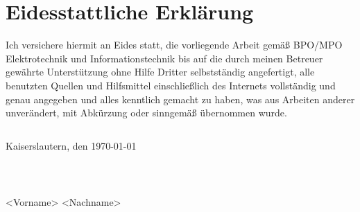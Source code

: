 \section*{Eidesstattliche Erklärung}

Ich versichere hiermit an Eides statt, die vorliegende Arbeit gemäß BPO/MPO Elektrotechnik und Informationstechnik bis auf die durch meinen Betreuer gewährte Unterstützung ohne Hilfe Dritter selbstständig angefertigt, alle benutzten Quellen und Hilfsmittel einschließlich des Internets vollständig und genau angegeben und alles kenntlich gemacht zu haben, was aus Arbeiten anderer unverändert, mit Abkürzung oder sinngemäß übernommen wurde.
\begin{verbatim}

\end{verbatim}
Kaiserslautern, den \today
\begin{verbatim}



\end{verbatim}
<Vorname> <Nachname>